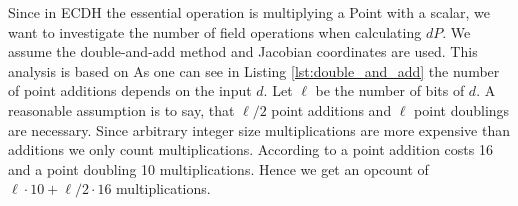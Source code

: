 Since in ECDH the essential operation is multiplying a Point with a scalar, we want to investigate the number of field operations when calculating $dP$. We assume the double-and-add method and Jacobian coordinates are used. This analysis is based on \cite[p. 63]{Blake:1999} As one can see in Listing \ref{lst:double_and_add} the number of point additions depends on the input $d$. Let $\ell$ be the number of bits of $d$. A reasonable assumption is to say, that $\ell / 2$ point additions and $\ell$ point doublings are necessary. Since arbitrary integer size multiplications are more expensive than additions we only count multiplications. According to \cite[p. 59, 60]{Brown:2009} a point addition costs 16 and a point doubling 10 multiplications. Hence we get an opcount of $\ell \cdot 10 + \ell / 2 \cdot 16$ multiplications.

